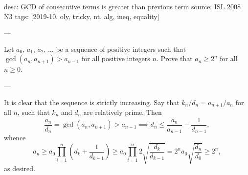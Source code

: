 desc: GCD of consecutive terms is greater than previous term
source: ISL 2008 N3
tags: [2019-10, oly, tricky, nt, alg, ineq, equality]

---

Let $a_0$, $a_1$, $a_2$, $\ldots$ be a sequence of positive integers such that $\gcd(a_n,a_{n+1})>a_{n-1}$ for all positive integers $n$. Prove that $a_n\ge2^n$ for all $n\ge0$.

---

It is clear that the sequence is strictly increasing. Say that $k_n/d_n=a_{n+1}/a_n$ for all $n$, such that $k_n$ and $d_n$ are relatively prime. Then \[\frac{a_n}{d_n}=\gcd(a_n,a_{n+1})>a_{n-1}\implies d_n\le\frac{a_n}{a_{n-1}}-\frac1{d_{n-1}},\]
whence \[a_n\ge a_0\prod_{i=1}^n\left(d_k+\frac1{d_{k-1}}\right)\ge a_0\prod_{i=1}^n2\sqrt{\frac{d_k}{d_{k-1}}}=2^na_0\sqrt{\frac{d_n}{d_0}}\ge2^n,\]
as desired.
